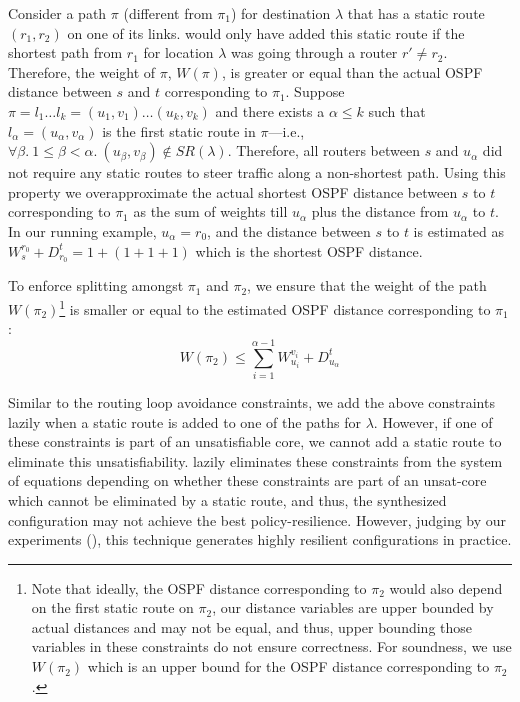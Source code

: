 Consider a path $\pi$ (different from $\pi_1$) for destination $\lambda$
that has  a  static route $(r_1, r_2)$ on one of its links.
\name would only have added this static route
if the shortest path from $r_1$ for location $\lambda$
was going through  a
router $r' \not= r_2$. 
Therefore, the weight of $\pi$,
$W(\pi)$, is greater or equal than the 
actual OSPF distance
between $s$ and $t$ corresponding to $\pi_1$. 
Suppose $\pi = l_1 \ldots l_k = (u_1, v_1) \ldots (u_k, v_k)$ 
and 
there exists a $\alpha \leq k$ such that 
$l_\alpha = (u_\alpha, v_\alpha)$  
is the first 
static route in $\pi$---i.e., 
$\forall \beta. ~1 \leq \beta < \alpha. ~(u_\beta, v_\beta) \not\in SR(\lambda)$.
Therefore, all routers between $s$ and $u_\alpha$ did
not require any static routes to steer traffic along a 
non-shortest path. 
Using this property we overapproximate
the
actual shortest OSPF distance  between $s$ to $t$ 
corresponding to $\pi_1$ 
as the sum of weights till $u_\alpha$ plus the distance
from $u_\alpha$ to $t$. In our running example, 
$u_\alpha = r_0$, and the distance between $s$ to $t$ 
is estimated as $W_s^{r_0} + D_{r_0}^t = 1 + (1 + 1 + 1)$
which is the shortest OSPF distance. 

To enforce splitting amongst
$\pi_1$ and $\pi_2$, we ensure that the weight 
of the path $W(\pi_2)$\footnote{
Note that ideally, the OSPF distance corresponding to 
$\pi_2$ would also depend on the first static route on
$\pi_2$, our distance variables are upper bounded by actual
distances and may not be equal, and thus, upper bounding 
those variables in these constraints do not ensure correctness.
For soundness, we use $W(\pi_2)$ which is an upper bound
for the OSPF distance corresponding to 
$\pi_2$. 
} 
is smaller or equal to 
the estimated OSPF distance corresponding to $\pi_1$: 
\begin{equation}
	W(\pi_2) \leq \sum_{i=1}^{\alpha - 1} W_{u_i}^{v_i} + D_{u_\alpha}^t	
\end{equation}

Similar to the routing loop avoidance constraints, we add the
above constraints lazily when a static route is added to one of the
paths for $\lambda$. However, if one of these constraints is part of 
an unsatisfiable core, we cannot add a static route to eliminate 
this unsatisfiability. \name lazily eliminates these constraints from the
system of equations depending on whether these constraints are part of 
an unsat-core which cannot be eliminated by a static route, and thus,
the synthesized configuration may not achieve the best 
policy-resilience. However, 
judging by our experiments (), 
this technique generates highly resilient configurations 
in practice. 
